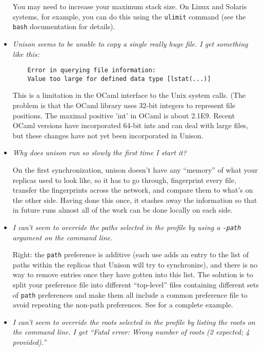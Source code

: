 \begin{itemize}
You may need to increase your maximum stack size.  On Linux and Solaris
systems, for example, you can do this using the {\tt ulimit} command (see
the {\tt bash} documentation for details).

\item {\em Unison seems to be unable to copy a single really huge file.
  I get something like this:}
\begin{verbatim}
    Error in querying file information:
    Value too large for defined data type [lstat(...)]
\end{verbatim}

This is a limitation in the OCaml interface to the Unix system calls.
(The problem is that the OCaml library uses 32-bit integers to represent
file positions.  The maximal positive 'int' in OCaml is about 2.1E9.  Recent
OCaml versions have incorporated 64-bit ints and can deal with large files,
but these changes have not yet been incorporated in Unison.  

\item {\em Why does unison run so slowly the first time I start it?}

On the first synchronization, unison doesn't have any ``memory'' of what
your replicas used to look like, so it has to go through, fingerprint
every file, transfer the fingerprints across the network, and compare
them to what's on the other side.  Having done this once, it stashes away
the information so that in future runs almost all of the work can be done
locally on each side.

\item {\em I can't seem to override the paths selected in the profile by
  using a {\tt -path} argument on the command line.}

Right: the {\tt path} preference is additive (each use adds an entry to
the list of paths within the replicas that Unison will try to
synchronize), and there is no way to remove entries once they have gotten
into this list.  The solution is to split your preference file into
different ``top-level'' files containing different sets of {\tt path}
preferences and make them all include a common preference file to avoid
repeating the non-path preferences.  See  for a complete example. 

\item {\em I can't seem to override the roots selected in the profile by
  listing the roots on the command line.  I get ``Fatal error: Wrong
  number of roots (2 expected; 4 provided).''}


\end{itemize}
